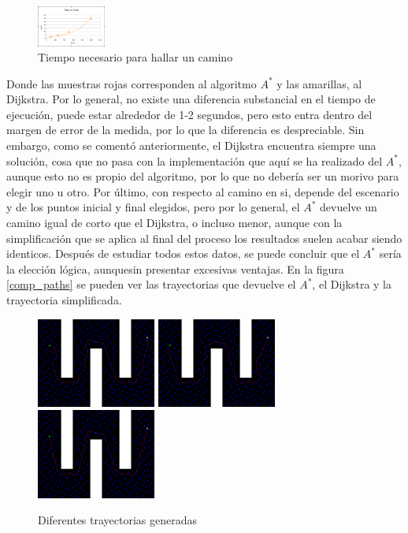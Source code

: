 \begin{figure}[H]
		\centering
        \includegraphics[width=0.2\textwidth]{images/t_vs_nodos_vs_alg.png}
        \caption{Tiempo necesario para hallar un camino}
        \label{fig:t_vs_alg}
\end{figure}

Donde las muestras rojas corresponden al algoritmo $A^*$ y las amarillas, al Dijkstra. Por lo general, no existe una diferencia substancial en el tiempo de ejecución, puede estar alrededor de 1-2 segundos, pero esto entra dentro del margen de error de la medida, por lo que la diferencia es despreciable. Sin embargo, como se comentó anteriormente, el Dijkstra encuentra siempre una solución, cosa que no pasa con la implementación que aquí se ha realizado del $A^*$, aunque esto no es propio del algoritmo, por lo que no debería ser un morivo para elegir uno u otro. Por último, con respecto al camino en si, depende del escenario y de los puntos inicial y final elegidos, pero por lo general, el $A^*$ devuelve un camino igual de corto que el Dijkstra, o incluso menor, aunque con la simplificación que se aplica al final del proceso los resultados suelen acabar siendo identicos. Después de estudiar todos estos datos, se puede concluir que el  $A^*$ sería la elección lógica, aunquesin presentar excesivas ventajas. En la figura \ref{comp_paths} se pueden ver las trayectorias que devuelve el  $A^*$, el Dijkstra y la trayectoria simplificada.\\

\begin{figure}[h]
		\centering
        \includegraphics[width=0.35\textwidth]{images/a500.png}
        \includegraphics[width=0.35\textwidth]{images/d500.png}
        \includegraphics[width=0.35\textwidth]{images/s500.png}
        \caption{Diferentes trayectorias generadas}
        \label{fig:comp_paths}
\end{figure}

